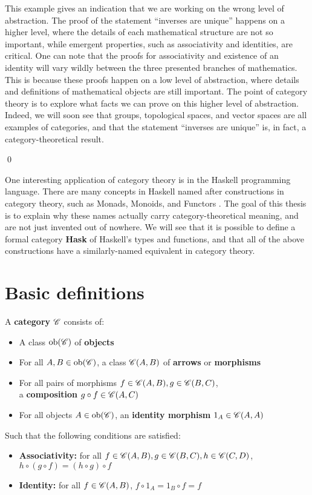 \documentclass[../thesis.tex]{subfiles}
\begin{document}
\begin{ex}
This example gives an indication that we are working on the wrong level of abstraction.
The proof of the statement ``inverses are unique'' happens on a higher level, where the details of each mathematical structure are not so important, while emergent properties, such as associativity and identities, are critical.
One can note that the proofs for associativity and existence of an identity will vary wildly between the three presented branches of mathematics.
This is because these proofs happen on a low level of abstraction, where details and definitions of mathematical objects are still important.
The point of category theory is to explore what facts we can prove on this higher level of abstraction.
Indeed, we will soon see that groups, topological spaces, and vector spaces are all examples of categories, and that the statement ``inverses are unique'' is, in fact, a category-theoretical result.

\qed
\end{ex}

One interesting application of category theory is in the Haskell programming language.
There are many concepts in Haskell named after constructions in category theory, such as Monads, Monoids, and Functors \cite{haskmooc}.
The goal of this thesis is to explain why these names actually carry category-theoretical meaning, and are not just invented out of nowhere.
We will see that it is possible to define a formal category \textbf{Hask} of Haskell's types and functions, and that all of the above constructions have a similarly-named equivalent in category theory.

\section{Basic definitions}

\begin{defn}
A \textbf{category} $\mathscr{C}$ consists of:
\begin{itemize}
    \item A class $\operatorname{ob}(\mathscr{C})$ of \textbf{objects}
    \item For all $A,B\in\operatorname{ob}(\mathscr{C})$, a class $\mathscr{C}(A,B)$ of \textbf{arrows} or \textbf{morphisms}
    \item For all pairs of morphisms $f\in \mathscr{C}(A,B), g\in \mathscr{C}(B,C)$,\\a \textbf{composition} $g \circ f \in \mathscr{C}(A,C)$
    \item For all objects $A\in \operatorname{ob}(\mathscr{C})$, an \textbf{identity morphism} $1_A \in \mathscr{C}(A,A)$
\end{itemize}
Such that the following conditions are satisfied:
\begin{itemize}
    \item \textbf{Associativity:} for all $f\in \mathscr{C}(A,B),g\in \mathscr{C}(B,C),h\in \mathscr{C}(C,D)$,\\$h\circ (g\circ f)=(h\circ g)\circ f$
    \item \textbf{Identity:} for all $f\in \mathscr{C}(A,B)$, $f\circ 1_A=1_B\circ f=f$
\end{itemize}
\end{defn}
\end{document}
